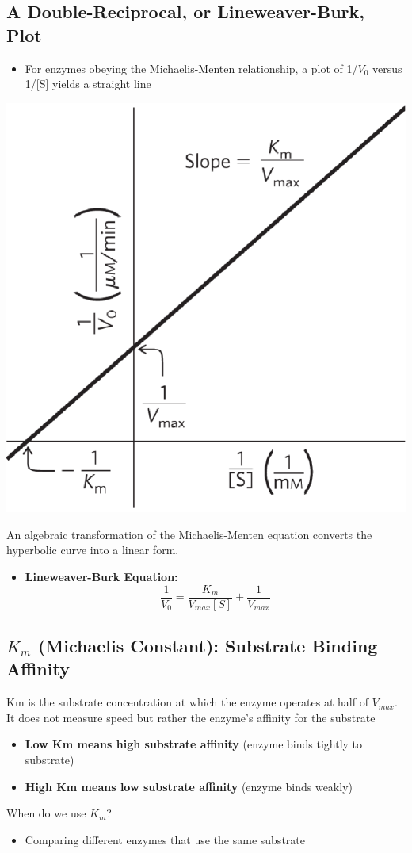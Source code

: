 \documentclass[10pt]{article}
\begin{document}
\subsection*{A Double-Reciprocal, or Lineweaver-Burk, Plot}
\begin{itemize}
    \item For enzymes obeying the Michaelis-Menten relationship, a plot of 1/$V_0$ versus 1/[S] yields a straight line
\end{itemize}
\begin{center}
    \includegraphics*[scale=0.45]{L1_7.png}
\end{center}
An algebraic transformation of the Michaelis-Menten equation converts the hyperbolic curve into a linear form.
\begin{itemize}
    \item \textbf{Lineweaver-Burk Equation:} 
    \[\frac{1}{V_0} = \frac{K_m}{V_{max}[S]} + \frac{1}{V_{max}}\]
\end{itemize}

\subsection*{$K_m$ (Michaelis Constant): Substrate Binding Affinity}
Km is the substrate concentration at which the enzyme operates at half of $V_{max}$.  It does not measure speed but rather the enzyme's affinity for the substrate
\begin{itemize}
    \item \textbf{Low Km means high substrate affinity} (enzyme binds tightly to substrate)
    \item \textbf{High Km means low substrate affinity} (enzyme binds weakly)
\end{itemize}
When do we use $K_m$?
\begin{itemize}
    \item Comparing different enzymes that use the same substrate
\end{itemize}
\end{document}
